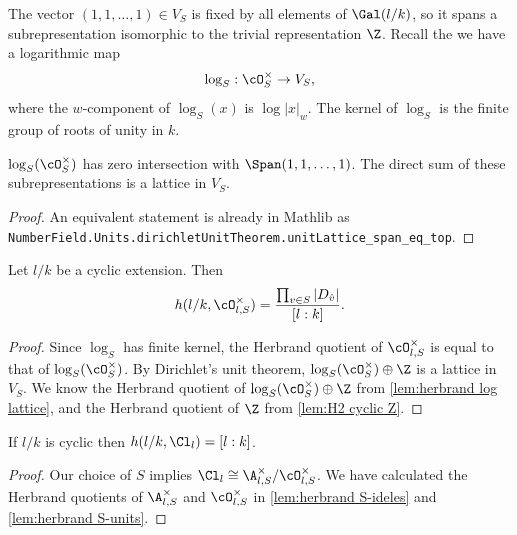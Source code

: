 The vector $(1,1,\ldots,1) \in V_S$ is fixed by all elements of $\Gal(l/k)$, so it spans
a subrepresentation isomorphic to the trivial representation $\Z$.
Recall the we have a logarithmic map
\[
	\log_S : \cO_S^\times \to V_S,
\]
where the $w$-component of $\log_S(x)$ is $\log |x|_w$.
The kernel of $\log_S$ is the finite group of roots of unity in $k$.

\begin{theorem} \label{thm:Dirichlet unit theorem}
	$\log_S(\cO_S^\times)$ has zero intersection with $\Span (1,1,\ldots,1)$.
	The direct sum of these subrepresentations is a lattice in $V_S$.
\end{theorem}

\begin{proof}
	An equivalent statement is already in Mathlib as
	\texttt{NumberField.Units.dirichletUnitTheorem.unitLattice\_span\_eq\_top}.
\end{proof}

\begin{corollary} \label{lem:herbrand S-units}
	Let $l/k$ be a cyclic extension. Then
	\[
		h(l/k,\cO_{l,S}^\times) = \frac{\prod_{v\in S} |D_{\hat v}|}{[l:k]}.
	\]
\end{corollary}

\begin{proof}
	Since $\log_S$ has finite kernel, the Herbrand quotient of $\cO_{l,S}^\times$ is
	equal to that of $\log_S(\cO_S^\times)$.
	By Dirichlet's unit theorem, $\log_S(\cO_S^\times) \oplus \Z$ is a lattice in
	$V_S$.
	We know the Herbrand quotient of $\log_S(\cO_S^\times) \oplus \Z$
	from \ref{lem:herbrand log lattice}, and the Herbrand quotient of $\Z$ from \ref{lem:H2 cyclic Z}.
\end{proof}

\begin{corollary} \label{lem:herbrand idele class group}
	If $l/k$ is cyclic then $h(l/k,\Cl_l) = [l:k]$.
\end{corollary}

\begin{proof}
	Our choice of $S$ implies $\Cl_l \cong \A_{l,S}^\times / \cO_{l,S}^\times$.
	We have calculated the Herbrand quotients of $\A_{l,S}^\times$ and $\cO_{l,S}^\times$
	in \ref{lem:herbrand S-ideles} and \ref{lem:herbrand S-units}.
\end{proof}





